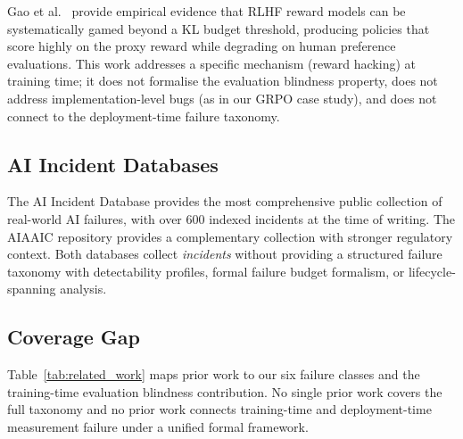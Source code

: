 \documentclass{article}
\begin{document}
Gao et al.\ \citep{gao2025rewardhacking} provide empirical evidence that RLHF
reward models can be systematically gamed beyond a KL budget threshold,
producing policies that score highly on the proxy reward while degrading on
human preference evaluations.  This work addresses a specific mechanism (reward
hacking) at training time; it does not formalise the evaluation blindness
property, does not address implementation-level bugs (as in our GRPO case study),
and does not connect to the deployment-time failure taxonomy.

\subsection{AI Incident Databases}

The AI Incident Database \citep{mcgregor2021aiid} provides the most
comprehensive public collection of real-world AI failures, with over 600
indexed incidents at the time of writing.  The AIAAIC
repository \citep{aiaaic2023} provides a complementary collection with
stronger regulatory context.  Both databases collect \emph{incidents} without
providing a structured failure taxonomy with detectability profiles, formal
failure budget formalism, or lifecycle-spanning analysis.

\subsection{Coverage Gap}

Table~\ref{tab:related_work} maps prior work to our six failure classes and
the training-time evaluation blindness contribution.  No single prior work
covers the full taxonomy and no prior work connects training-time and
deployment-time measurement failure under a unified formal framework.
\end{document}
